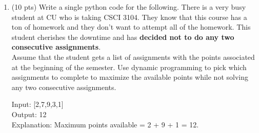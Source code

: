 \documentclass[12pt]{article}
\theoremstyle{remark}
\newtheorem*{solution}{Solution}
\begin{document}
\begin{enumerate}
\begin{enumerate}
\begin{solution}
values are just pulled from the array we already calculated). $\newline$ The bottom-up $\Theta(1)$ version inherits a lot of the benefits of the regular bottom-up, in that it only relies on a loop. This one, however, only stores a little in the form of variables, assuming the loop is sequential. It only uses a few variables to store some of the most recent instead of holding a whole array, which makes its scope pretty small, but makes the space complexity only the variables, and as such, $\Theta(1)$.
    \end{solution}


	\end{enumerate}
    \pagebreak

    \item (10 pts) Write a single python code for the following. There is a very busy student at CU who is taking CSCI 3104. They know that this course has a ton of homework and they don't want to attempt all of the homework. This student cherishes the downtime and has \textbf{decided not to do any two consecutive assignments}.
    \\
    Assume that the student gets a list of assignments with the points associated at the beginning of the semester. Use dynamic programming to pick which assignments to complete to maximize the available points while not solving any two consecutive assignments. 
    
    Input: [2,7,9,3,1]\\
    Output: 12\\
    Explanation: Maximum points available = 2 + 9 + 1 = 12.\\
    
    
    

\end{enumerate}
\end{document}
